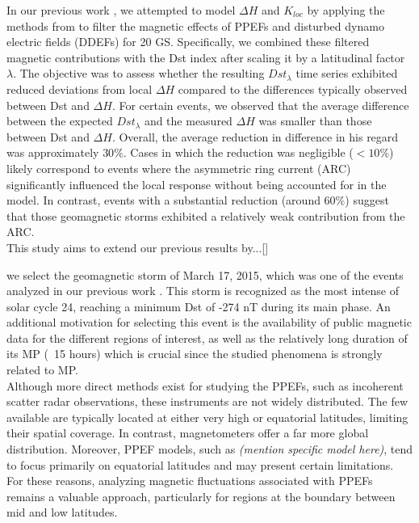 \documentclass[a4paper]{article}
\theoremstyle{plain}
\theoremstyle{definition}
\begin{document}
	In our previous work \citep{CASTELLANOSVELAZCO2024}, we attempted to model $\Delta H$ and $K_{loc}$ by applying the methods from \cite{ddyn2005} to filter the magnetic effects of PPEFs and disturbed dynamo electric fields (DDEFs) for 20 GS. Specifically, we combined these filtered magnetic contributions with the Dst index after scaling it by a latitudinal factor $\lambda$. The objective was to assess whether the resulting $Dst_\lambda$ time series exhibited reduced deviations from local $\Delta H$ compared to the differences typically observed between Dst and $\Delta H$. For certain events, we observed that the average difference between the expected $Dst_\lambda$ and the measured $\Delta H$ was smaller than those between Dst and $\Delta H$. Overall, the average reduction in difference in his regard was approximately $30\%$. Cases in which the reduction was negligible ($<10\%$) likely correspond to events where the asymmetric ring current (ARC) significantly influenced the local response without being accounted for in the model. In contrast, events with a substantial reduction (around $60\%$) suggest that those geomagnetic storms exhibited a relatively weak contribution from the ARC.\\	
	
	This study aims to extend our previous results by...[]
	
	
	we select the geomagnetic storm of March 17, 2015, which was one of the events analyzed in our previous work \citep{CASTELLANOSVELAZCO2024}. This storm is recognized as the most intense of solar cycle 24, reaching a minimum Dst of -274 nT during its main phase. An additional motivation for selecting this event is the availability of public magnetic data for the different regions of interest, as well as the relatively long duration of its MP (~15 hours) which is crucial since the studied phenomena is strongly related to MP.\\
	
	Although more direct methods exist for studying the PPEFs, such as incoherent scatter radar observations, these instruments are not widely distributed. The few available are typically located at either very high or equatorial latitudes, limiting their spatial coverage. In contrast, magnetometers offer a far more global distribution. Moreover, PPEF models, such as \textit{(mention specific model here)}, tend to focus primarily on equatorial latitudes and may present certain limitations. For these reasons, analyzing magnetic fluctuations associated with PPEFs remains a valuable approach, particularly for regions at the boundary between mid and low latitudes.\\
	
\end{document}
